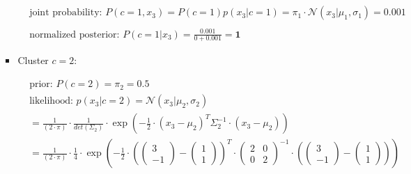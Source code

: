 \documentclass[12pt]{article}
\begin{document}
\begin{enumerate}
\begin{enumerate}[label=\arabic*)]
\begin{itemize}[label=]
\begin{equation*}
\begin{aligned}
                    \\
                    &\text{joint probability: } P(c=1, x_3) =  P(c=1)p(x_3|c=1) = \pi_1 \cdot \mathcal{N}(x_3| \mu_1, \sigma_1) = \mathbf{0.001}\\
                    \\
                    &\text{normalized posterior: } P(c=1|x_3)= \frac{0.001}{0+0.001} = \mathbf{1}
                \end{aligned}
            \end{equation*}

            \newpage
            \item Cluster $c=2$:
            
            \begin{equation*}
                \begin{aligned}
                    &\text{prior: } P(c=2) = \pi_2 = \mathbf{0.5} \\
                    &\text{likelihood: } p(x_3|c=2) = \mathcal{N}(x_3| \mu_2, \sigma_2) \\
                    &= \frac{1}{(2 \cdot \pi)} \cdot \frac{1}{det(\Sigma_2)} \cdot \exp \left( -\frac{1}{2} \cdot (x_3 - \mu_2)^{T} \Sigma_2^{-1} \cdot (x_3 - \mu_2) \right)\\
                    &= \frac{1}{(2 \cdot \pi)} \cdot \frac{1}{4} \cdot \exp \left( -\frac{1}{2} \cdot \left(\begin{pmatrix}
                    3\\
                    -1
                    \end{pmatrix} - \begin{pmatrix}
                    1\\
                    1
                    \end{pmatrix}\right)^{T} \cdot \begin{pmatrix}
                    2 & 0\\
                    0 & 2
                    \end{pmatrix}^{-1} \cdot \left(\begin{pmatrix}
                    3\\
                    -1
                    \end{pmatrix} - \begin{pmatrix}
                    1\\
                    1
                    \end{pmatrix}\right) \right)\\

\end{aligned}
\end{equation*}
\end{itemize}
\end{enumerate}
\end{enumerate}
\end{document}
